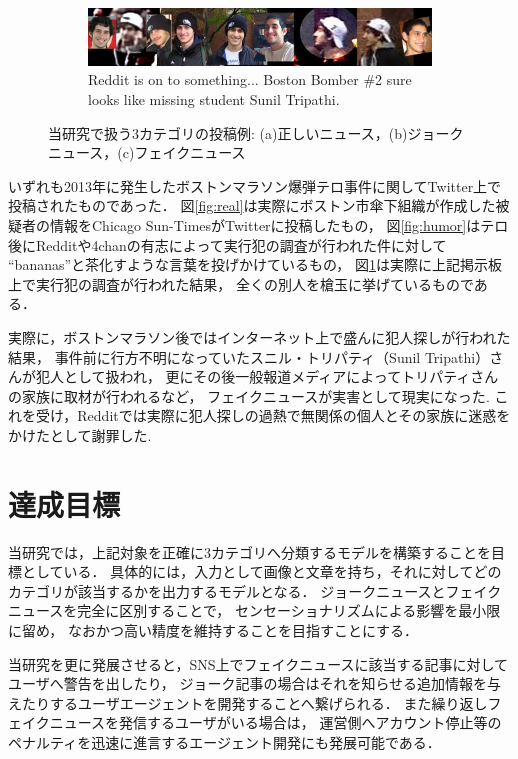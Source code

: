 \begin{figure}[ht]
\begin{subfigure}[b]{\textwidth}
        \includegraphics[width=\textwidth]{images/fake_example_boston.jpg}
        \caption{Reddit is on to something... Boston Bomber \#2 sure looks like missing student Sunil Tripathi. }
        \label{fig:fake}
    \end{subfigure}
    \caption{当研究で扱う3カテゴリの投稿例: (a)正しいニュース，(b)ジョークニュース，(c)フェイクニュース}
    \label{fig:examples}
\end{figure}

いずれも2013年に発生したボストンマラソン爆弾テロ事件に関してTwitter上で投稿されたものであった．
図\ref{fig:real}は実際にボストン市傘下組織が作成した被疑者の情報をChicago Sun-TimesがTwitterに投稿したもの，
図\ref{fig:humor}はテロ後にRedditや4chanの有志によって実行犯の調査が行われた件に対して
``bananas''と茶化すような言葉を投げかけているもの，
図\ref{fig:fake}は実際に上記掲示板上で実行犯の調査が行われた結果，
全くの別人を槍玉に挙げているものである．

実際に，ボストンマラソン後ではインターネット上で盛んに犯人探しが行われた結果，
事件前に行方不明になっていたスニル・トリパティ（Sunil Tripathi）さんが犯人として扱われ，
更にその後一般報道メディアによってトリパティさんの家族に取材が行われるなど，
フェイクニュースが実害として現実になった\cite{gray_2013}.
これを受け，Redditでは実際に犯人探しの過熱で無関係の個人とその家族に迷惑をかけたとして謝罪した\cite{laird_2013}.

%
\section{達成目標}
当研究では，上記対象を正確に3カテゴリへ分類するモデルを構築することを目標としている．
具体的には，入力として画像と文章を持ち，それに対してどのカテゴリが該当するかを出力するモデルとなる．
ジョークニュースとフェイクニュースを完全に区別することで，
センセーショナリズムによる影響を最小限に留め，
なおかつ高い精度を維持することを目指すことにする．

当研究を更に発展させると，SNS上でフェイクニュースに該当する記事に対してユーザへ警告を出したり，
ジョーク記事の場合はそれを知らせる追加情報を与えたりするユーザエージェントを開発することへ繋げられる．
また繰り返しフェイクニュースを発信するユーザがいる場合は，
運営側へアカウント停止等のペナルティを迅速に進言するエージェント開発にも発展可能である．

%